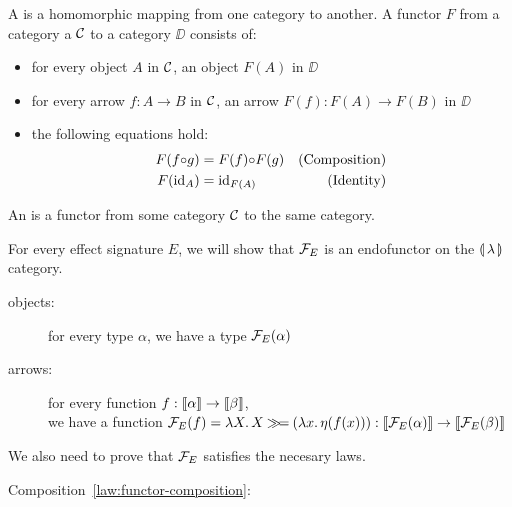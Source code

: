 \begin{definition}
A  is a homomorphic mapping from one category to
another. A functor $F$ from a category a $\mathcal{C}$ to a category $\DD$
consists of:
\begin{itemize}
\item for every object $A$ in $\mathcal{C}$, an object $F(A)$ in $\DD$
\item for every arrow $f : A \to B$ in $\mathcal{C}$, an arrow $F(f) : F(A) \to
  F(B)$ in $\DD$
\item the following equations hold:
  \begin{align}
    \label{law:functor-composition}F(f {\mathbin{\circ}} g) &= F(f) {\mathbin{\circ}} F(g) & \text{(Composition)} \\
    \label{law:functor-identity}F(\mathrm{id}_A) &= \mathrm{id}_{F(A)} & \text{(Identity)}
  \end{align}
\end{itemize}
\end{definition}

\begin{definition}
  An  is a functor from some category $\mathcal{C}$ to the same
  category.
\end{definition}

For every effect signature $E$, we will show that $\mathcal{F}_E$ is an endofunctor
on the $\llparenthesis \, \lambda \, \rrparenthesis$ category.
\begin{description}
\item[objects:] for every type $\alpha$, we have a type $\mathcal{F}_E(\alpha)$
\item[arrows:] for every function $f : \llbracket \alpha \rrbracket \to \llbracket \beta \rrbracket$, \\ we
  have a function
  $\mathcal{F}_E(f) = \lambda X.\, X \mathbin{\gg\!=} (\lambda x.\, \eta(f(x))) :
  \llbracket \mathcal{F}_E(\alpha) \rrbracket \to \llbracket \mathcal{F}_E(\beta) \rrbracket$
\end{description}

We also need to prove that $\mathcal{F}_E$ satisfies the necesary laws.

Composition~\eqref{law:functor-composition}:

